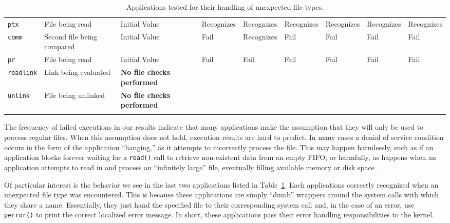 \begin{table}[t]
\begin{tabular}{l  l  |  l  l  l  l  l  l  l}
        {\tt ptx}         & File being read            & Initial Value  & Recognizes     & Recognizes  & Recognizes & Recognizes  & Recognizes & Recognizes\\
        {\tt comm}        & Second file being compared & Initial Value  & Fail           & Recognizes  & Fail       & Fail        & Fail       & Fail\\
        {\tt pr}          & File being read            & Initial Value  & Fail           & Fail        & Fail       & Fail        & Fail       & Fail\\
\hline
        {\tt readlink}    & Link being evaluated       & \textbf{No file checks performed} & & & & & & \\
        {\tt unlink}      & File being unlinked        & \textbf{No file checks performed} & & & & & & \\
    \bottomrule{}
    \end{tabular}
    \caption{Applications tested for their handling of unexpected file types.}
    \label{table:unexpectedtypes}
\end{table}

The frequency of failed executions in our results indicate that many
applications make the assumption that they will only be used to process
regular files.  When this assumption does not hold, execution results 
are hard to predict.  In many cases a denial of
service condition occurs in the form of the application ``hanging,'' as it
attempts to incorrectly process the file.  This may happen harmlessly, such
as if an application blocks forever waiting for a {\tt read()}
call to retrieve non-existent data from an empty FIFO, or harmfully, as
happens when an application attempts to read in and process an
``infinitely large'' file, eventually filling available memory or disk
space~\cite{Cappos_CCS_08}.


Of particular interest is the behavior we see
in the last two applications listed in Table~\ref{table:unexpectedtypes}.  Each 
applications correctly recognized when an unexpected file type 
was encountered.  This is because these applications are simply ``dumb'' wrappers
around the system calls with which they share a name. Essentially, they just hand
the specified file to their corresponding system call and, in the case of an
error, use {\tt perror()} to print the correct localized error message.  In
short, these applications pass their error handling responsibilities to the
kernel.


